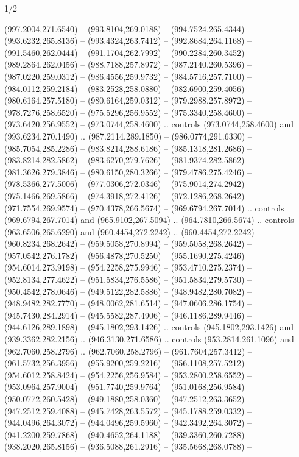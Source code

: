 \begin{flagdescription}{1/2}
\begin{scope}[xshift=0.75\flaglength,yshift=0.5\flagwidth,scale=0.00293\flagwidth]
\begin{scope}[scale=0.675,y=0.80pt, x=0.80pt,yscale=-1,xshift=-720,yshift=-240]
\begin{scope}[miter limit=4.80]
  (997.2004,271.6540) -- (993.8104,269.0188) -- (994.7524,265.4344) --
  (993.6232,265.8136) -- (993.4324,263.7412) -- (992.8684,264.1168) --
  (991.5460,262.0444) -- (991.1704,262.7992) -- (990.2284,260.3452) --
  (989.2864,262.0456) -- (988.7188,257.8972) -- (987.2140,260.5396) --
  (987.0220,259.0312) -- (986.4556,259.9732) -- (984.5716,257.7100) --
  (984.0112,259.2184) -- (983.2528,258.0880) -- (982.6900,259.4056) --
  (980.6164,257.5180) -- (980.6164,259.0312) -- (979.2988,257.8972) --
  (978.7276,258.6520) -- (975.5296,256.9552) -- (975.3340,258.4600) --
  (973.6420,256.9552) -- (973.0744,258.4600) .. controls (973.0744,258.4600) and
  (993.6234,270.1490) .. (987.2114,289.1850) -- (986.0774,291.6330) --
  (985.7054,285.2286) -- (983.8214,288.6186) -- (985.1318,281.2686) --
  (983.8214,282.5862) -- (983.6270,279.7626) -- (981.9374,282.5862) --
  (981.3626,279.3846) -- (980.6150,280.3266) -- (979.4786,275.4246) --
  (978.5366,277.5006) -- (977.0306,272.0346) -- (975.9014,274.2942) --
  (975.1466,269.5866) -- (974.3918,272.4126) -- (972.1286,268.2642) --
  (971.7554,269.9574) -- (970.4378,266.5674) -- (969.6794,267.7014) .. controls
  (969.6794,267.7014) and (965.9102,267.5094) .. (964.7810,266.5674) .. controls
  (963.6506,265.6290) and (960.4454,272.2242) .. (960.4454,272.2242) --
  (960.8234,268.2642) -- (959.5058,270.8994) -- (959.5058,268.2642) --
  (957.0542,276.1782) -- (956.4878,270.5250) -- (955.1690,275.4246) --
  (954.6014,273.9198) -- (954.2258,275.9946) -- (953.4710,275.2374) --
  (952.8134,277.4622) -- (951.5834,276.5586) -- (951.5834,279.5730) --
  (950.4542,278.0646) -- (949.5122,282.5886) -- (948.9482,280.7082) --
  (948.9482,282.7770) -- (948.0062,281.6514) -- (947.0606,286.1754) --
  (945.7430,284.2914) -- (945.5582,287.4906) -- (946.1186,289.9446) --
  (944.6126,289.1898) -- (945.1802,293.1426) .. controls (945.1802,293.1426) and
  (939.3362,282.2156) .. (946.3130,271.6586) .. controls (953.2814,261.1096) and
  (962.7060,258.2796) .. (962.7060,258.2796) -- (961.7604,257.3412) --
  (961.5732,256.3956) -- (955.9200,259.2216) -- (956.1108,257.5212) --
  (954.6012,258.8424) -- (954.2256,256.9584) -- (953.2800,258.6552) --
  (953.0964,257.9004) -- (951.7740,259.9764) -- (951.0168,256.9584) --
  (950.0772,260.5428) -- (949.1880,258.0360) -- (947.2512,263.3652) --
  (947.2512,259.4088) -- (945.7428,263.5572) -- (945.1788,259.0332) --
  (944.0496,264.3072) -- (944.0496,259.5960) -- (942.3492,264.3072) --
  (941.2200,259.7868) -- (940.4652,264.1188) -- (939.3360,260.7288) --
  (938.2020,265.8156) -- (936.5088,261.2916) -- (935.5668,268.0788) --

\end{scope}
\end{scope}
\end{scope}
\end{flagdescription}
